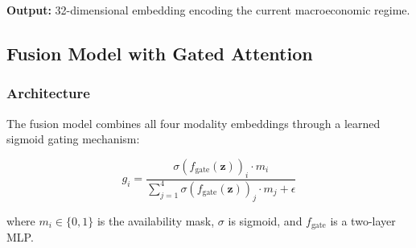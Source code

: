 \textbf{Output:} 32-dimensional embedding encoding the current macroeconomic regime.

\subsection{Fusion Model with Gated Attention}

\subsubsection{Architecture}

The fusion model combines all four modality embeddings through a learned sigmoid gating mechanism:

\begin{equation}
    g_i = \frac{\sigma(f_{\text{gate}}(\mathbf{z}))_i \cdot m_i}{\sum_{j=1}^{4} \sigma(f_{\text{gate}}(\mathbf{z}))_j \cdot m_j + \epsilon}
\end{equation}

where $m_i \in \{0,1\}$ is the availability mask, $\sigma$ is sigmoid, and $f_{\text{gate}}$ is a two-layer MLP.

